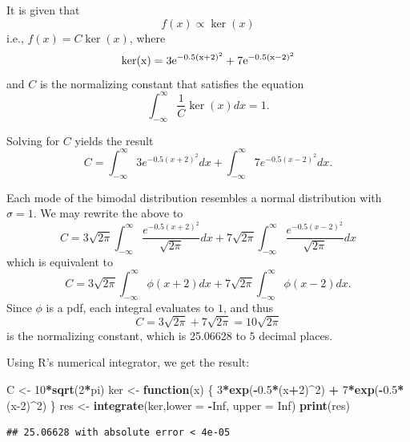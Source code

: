 \documentclass[
]{article}
\newenvironment{Shaded}{\begin{snugshade}}{\end{snugshade}}
\newcommand{\AttributeTok}[1]{\textcolor[rgb]{0.13,0.29,0.53}{#1}}
\newcommand{\ConstantTok}[1]{\textcolor[rgb]{0.56,0.35,0.01}{#1}}
\newcommand{\ControlFlowTok}[1]{\textcolor[rgb]{0.13,0.29,0.53}{\textbf{#1}}}
\newcommand{\DecValTok}[1]{\textcolor[rgb]{0.00,0.00,0.81}{#1}}
\newcommand{\FloatTok}[1]{\textcolor[rgb]{0.00,0.00,0.81}{#1}}
\newcommand{\FunctionTok}[1]{\textcolor[rgb]{0.13,0.29,0.53}{\textbf{#1}}}
\newcommand{\NormalTok}[1]{#1}
\newcommand{\OtherTok}[1]{\textcolor[rgb]{0.56,0.35,0.01}{#1}}
\newcommand{\SpecialCharTok}[1]{\textcolor[rgb]{0.81,0.36,0.00}{\textbf{#1}}}
\begin{document}
It is given that \[
  f(x) \propto \ker(x)
\] i.e., \(f(x) = C \ker(x)\), where \[
  \rm{ker}(x) = 3 e^{-0.5(x+2)^2} + 7 e^{-0.5(x-2)^2}
\] and \(C\) is the normalizing constant that satisfies the equation \[
  \int_{-\infty}^{\infty} \frac{1}{C} \ker(x) dx = 1.
\]

Solving for \(C\) yields the result \[
  C = \int_{-\infty}^{\infty} 3 e^{-0.5(x+2)^2} dx + \int_{-\infty}^{\infty} 7 e^{-0.5(x-2)^2} dx.
\]

Each mode of the bimodal distribution resembles a normal distribution
with \(\sigma = 1\). We may rewrite the above to \[
  C = 3 \sqrt{2 \pi} \int_{-\infty}^{\infty} \frac{e^{-0.5(x+2)^2}}{\sqrt{2 \pi}} dx + 7 \sqrt{2 \pi} \int_{-\infty}^{\infty} \frac{e^{-0.5(x-2)^2}}{\sqrt{2 \pi}} dx
\] which is equivalent to \[
  C = 3 \sqrt{2 \pi} \int_{-\infty}^{\infty} \phi(x+2) dx + 7 \sqrt{2 \pi} \int_{-\infty}^{\infty} \phi(x-2) dx.
\] Since \(\phi\) is a pdf, each integral evaluates to \(1\), and thus
\[
  C = 3 \sqrt{2 \pi} + 7 \sqrt{2 \pi} = 10 \sqrt{2 \pi}
\] is the normalizing constant, which is 25.06628 to \(5\) decimal
places.

Using R's numerical integrator, we get the result:

\begin{Shaded}
\begin{Highlighting}[]
\NormalTok{C }\OtherTok{\textless{}{-}} \DecValTok{10}\SpecialCharTok{*}\FunctionTok{sqrt}\NormalTok{(}\DecValTok{2}\SpecialCharTok{*}\NormalTok{pi)}
\NormalTok{ker }\OtherTok{\textless{}{-}} \ControlFlowTok{function}\NormalTok{(x) \{ }\DecValTok{3}\SpecialCharTok{*}\FunctionTok{exp}\NormalTok{(}\SpecialCharTok{{-}}\FloatTok{0.5}\SpecialCharTok{*}\NormalTok{(x}\SpecialCharTok{+}\DecValTok{2}\NormalTok{)}\SpecialCharTok{\^{}}\DecValTok{2}\NormalTok{) }\SpecialCharTok{+} \DecValTok{7}\SpecialCharTok{*}\FunctionTok{exp}\NormalTok{(}\SpecialCharTok{{-}}\FloatTok{0.5}\SpecialCharTok{*}\NormalTok{(x}\DecValTok{{-}2}\NormalTok{)}\SpecialCharTok{\^{}}\DecValTok{2}\NormalTok{) \}}
\NormalTok{res }\OtherTok{\textless{}{-}} \FunctionTok{integrate}\NormalTok{(ker,}\AttributeTok{lower =} \SpecialCharTok{{-}}\ConstantTok{Inf}\NormalTok{, }\AttributeTok{upper =} \ConstantTok{Inf}\NormalTok{)}
\FunctionTok{print}\NormalTok{(res)}
\end{Highlighting}
\end{Shaded}

\begin{verbatim}
## 25.06628 with absolute error < 4e-05
\end{verbatim}
\end{document}
